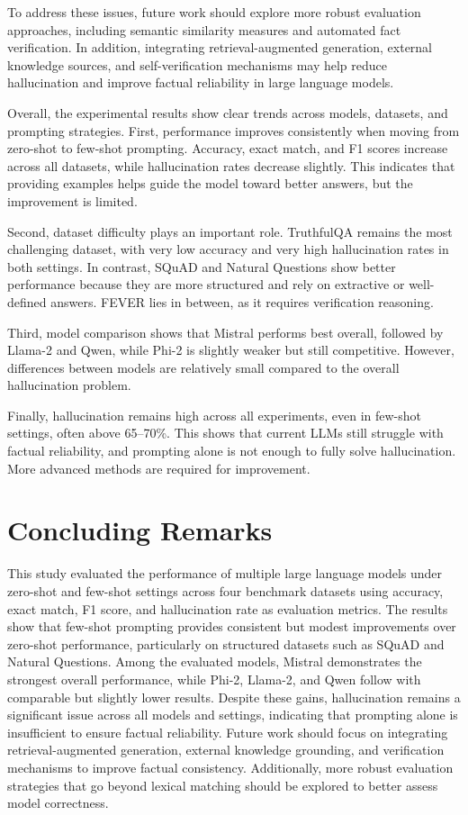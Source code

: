\documentclass[sigconf,nonacm]{acmart}
\begin{document}
To address these issues, future work should explore more robust evaluation approaches, including semantic similarity measures and automated fact verification. In addition, integrating retrieval-augmented generation, external knowledge sources, and self-verification mechanisms may help reduce hallucination and improve factual reliability in large language models.


Overall, the experimental results show clear trends across models, datasets, and prompting strategies. First, performance improves consistently when moving from zero-shot to few-shot prompting. Accuracy, exact match, and F1 scores increase across all datasets, while hallucination rates decrease slightly. This indicates that providing examples helps guide the model toward better answers, but the improvement is limited.

Second, dataset difficulty plays an important role. TruthfulQA remains the most challenging dataset, with very low accuracy and very high hallucination rates in both settings. In contrast, SQuAD and Natural Questions show better performance because they are more structured and rely on extractive or well-defined answers. FEVER lies in between, as it requires verification reasoning.

Third, model comparison shows that Mistral performs best overall, followed by Llama-2 and Qwen, while Phi-2 is slightly weaker but still competitive. However, differences between models are relatively small compared to the overall hallucination problem.

Finally, hallucination remains high across all experiments, even in few-shot settings, often above 65–70\%. This shows that current LLMs still struggle with factual reliability, and prompting alone is not enough to fully solve hallucination. More advanced methods are required for improvement.

\section{Concluding Remarks}

This study evaluated the performance of multiple large language models under zero-shot and few-shot settings across four benchmark datasets using accuracy, exact match, F1 score, and hallucination rate as evaluation metrics. The results show that few-shot prompting provides consistent but modest improvements over zero-shot performance, particularly on structured datasets such as SQuAD and Natural Questions. Among the evaluated models, Mistral demonstrates the strongest overall performance, while Phi-2, Llama-2, and Qwen follow with comparable but slightly lower results. Despite these gains, hallucination remains a significant issue across all models and settings, indicating that prompting alone is insufficient to ensure factual reliability. Future work should focus on integrating retrieval-augmented generation, external knowledge grounding, and verification mechanisms to improve factual consistency. Additionally, more robust evaluation strategies that go beyond lexical matching should be explored to better assess model correctness.
\end{document}
